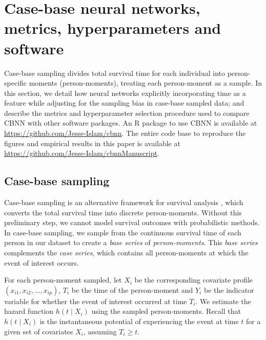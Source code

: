 \documentclass[APA,LATO1COL]{WileyNJD-v2}
\begin{document}

\hypertarget{methods}{%
\section{Case-base neural networks, metrics, hyperparameters and
software}\label{methods}}

Case-base sampling divides total survival time for each individual into person-specific moments
(person-moments), treating each person-moment as a sample. In this section, we detail how neural
networks explicitly incorporating time as a feature while adjusting for the sampling bias in case-base
sampled data; and describe the metrics and hyperparameter selection procedure used to compare
CBNN with other software packages. An R package to use CBNN is available at
\url{https://github.com/Jesse-Islam/cbnn}. The entire code base to reproduce the figures
and empirical results in this paper is available at \url{https://github.com/Jesse-Islam/cbnnManuscript}.

\hypertarget{case-base-sampling}{%
\subsection{Case-base sampling}\label{case-base-sampling}}

Case-base sampling is an alternative framework for survival analysis \citep{hanley2009},
which converts the total survival time into discrete person-moments. Without this preliminary step,
we cannot model survival outcomes with probabilistic methods. In case-base sampling, we sample
from the continuous survival time of each person in our dataset to create a \emph{base series} of
\emph{person-moments}. This \emph{base series} complements the \emph{case series}, which contains
all person-moments at which the event of interest occurs.

For each person-moment sampled, let \(X_i\) be the corresponding covariate profile
\(\left(x_{i1},x_{i2},...,x_{ip} \right)\), \(T_i\) be the time of the person-moment and \(Y_i\) be the indicator
variable for whether the event of interest occurred at time \(T_i\). We estimate the hazard function
\(h(t \mid X_i)\) using the sampled person-moments. Recall that \(h(t \mid X_i)\) is the instantaneous
potential of experiencing the event at time \(t\) for a given set of covariates \(X_i\), assuming \(T_i \geq t\).
\end{document}
